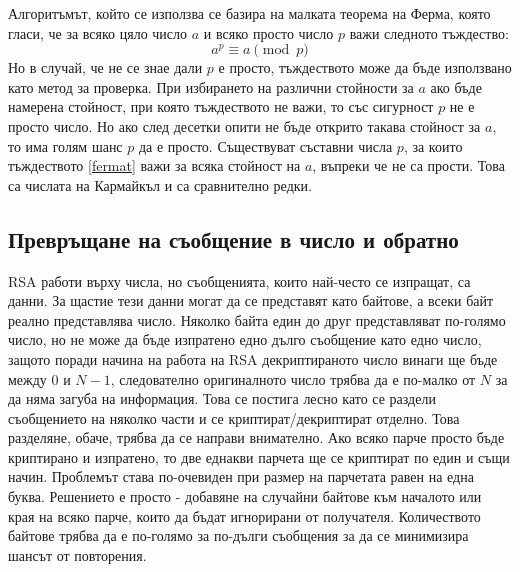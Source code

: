   Алгоритъмът, който се използва се базира на малката теорема на Ферма, която гласи, че за всяко цяло число $a$ и всяко просто число $p$ важи следното тъждество:
  \begin{equation}
    a^p \equiv a \pmod{p}
    \label{fermat}
  \end{equation}
  Но в случай, че не се знае дали $p$ е просто, тъждеството може да бъде използвано като метод за проверка. При избирането на различни стойности за $a$ ако бъде намерена стойност, при която тъждеството не важи, то със сигурност $p$ не е просто число. Но ако след десетки опити не бъде открито такава стойност за $a$, то има голям шанс $p$ да е просто.
  Съществуват съставни числа $p$, за които тъждеството \ref{fermat} важи за всяка стойност на $a$, въпреки че не са прости. Това са числата на Кармайкъл и са сравнително редки.\cite{carmichaelrare} %

  \subsection{Превръщане на съобщение в число и обратно} \label{paddingscheme}
  RSA работи върху числа, но съобщенията, които най-често се изпращат, са данни. За щастие тези данни могат да се представят като байтове, а всеки байт реално представлява число. Няколко байта един до друг представляват по-голямо число, но не може да бъде изпратено едно дълго съобщение като едно число, защото поради начина на работа на RSA декриптираното число винаги ще бъде между $0$ и $N-1$, следователно оригиналното число трябва да е по-малко от $N$ за да няма загуба на информация. Това се постига лесно като се раздели съобщението на няколко части и се криптират/декриптират отделно. Това разделяне, обаче, трябва да се направи внимателно. Ако всяко парче просто бъде криптирано и изпратено, то две еднакви парчета ще се криптират по един и същи начин. Проблемът става по-очевиден при размер на парчетата равен на една буква. Решението е просто - добавяне на случайни байтове към началото или края на всяко парче, които да бъдат игнорирани от получателя. Количеството байтове трябва да е по-голямо за по-дълги съобщения за да се минимизира шансът от повторения.

